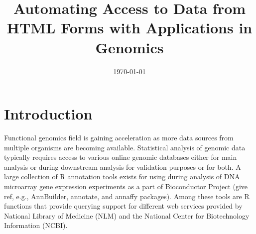 \documentclass[notitlepage,11pt]{article}
\title{Automating Access to Data from HTML Forms with Applications in Genomics}
\author{}
\date{\today}
\begin{document}
\maketitle


\begin{abstract}
\end{abstract}

\section{Introduction}
Functional genomics field is gaining acceleration as more 
data sources from multiple organisms are becoming available. Statistical analysis of genomic data typically  requires 
access to various online genomic databases either for main analysis or during  downstream analysis for 
validation purposes or for both. A large collection of R annotation tools exists for using   during analysis 
of  DNA microarray  gene expression experiments as a part of Bioconductor Project (give ref, e.g., AnnBuilder, annotate, and annaffy
 packages). Among these  tools are R functions that provide querying support for different web services provided by 
National Library of Medicine (NLM) and  the National Center for Biotechnology Information (NCBI). 
\end{document}
